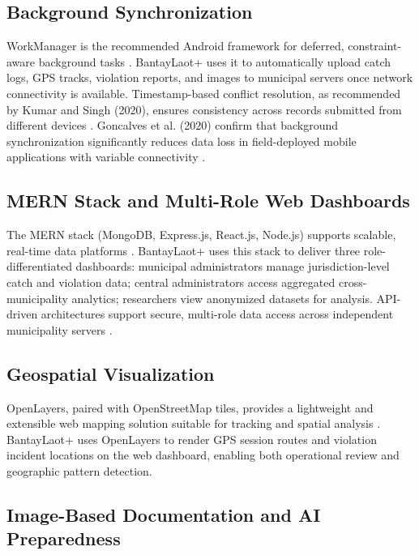 \documentclass[journal]{IEEEtran}
\begin{document}
\subsection{Background Synchronization}

WorkManager is the recommended Android framework for deferred, constraint-aware background
tasks \cite{Google2022}. BantayLaot+ uses it to automatically upload catch logs, GPS
tracks, violation reports, and images to municipal servers once network connectivity is
available. Timestamp-based conflict resolution, as recommended by Kumar and
Singh (2020), ensures consistency across records submitted from different devices
\cite{Kumar2020}. Goncalves et al. (2020) confirm that background synchronization
significantly reduces data loss in field-deployed mobile applications with variable
connectivity \cite{Goncalves2020}.

\subsection{MERN Stack and Multi-Role Web Dashboards}

The MERN stack (MongoDB, Express.js, React.js, Node.js) supports scalable, real-time
data platforms \cite{Chodorow2013}. BantayLaot+ uses this stack to deliver three
role-differentiated dashboards: municipal administrators manage jurisdiction-level catch
and violation data; central administrators access aggregated cross-municipality analytics;
researchers view anonymized datasets for analysis. API-driven architectures support
secure, multi-role data access across independent municipality servers \cite{Alzubaidi2020}.

\subsection{Geospatial Visualization}

OpenLayers, paired with OpenStreetMap tiles, provides a lightweight and extensible web
mapping solution suitable for tracking and spatial analysis \cite{Haklay2008}.
BantayLaot+ uses OpenLayers to render GPS session routes and violation incident locations
on the web dashboard, enabling both operational review and geographic pattern detection.

\subsection{Image-Based Documentation and AI Preparedness}
\end{document}
